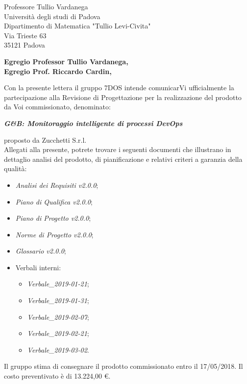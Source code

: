 \begin{letter}{Professore Tullio Vardanega \\ Università degli studi di Padova \\ Dipartimento di Matematica "Tullio Levi-Civita" \\ Via Trieste 63 \\ 35121 Padova}
\opening{\textbf{Egregio Professor Tullio Vardanega,\\Egregio Prof. Riccardo Cardin,}}
\begin{addmargin}[2em]{2em}
  Con la presente lettera il gruppo 7DOS intende comunicarVi ufficialmente la partecipazione alla Revisione di Progettazione per la realizzazione del prodotto da Voi commissionato, denominato:
   \singlespacing 
   \centerline{\textbf{\emph{G\&B: Monitoraggio intelligente di processi DevOps}}}
  \singlespacing
  proposto da Zucchetti S.r.l. \\
  Allegati alla presente, potrete trovare i seguenti documenti che illustrano in dettaglio analisi del prodotto, di pianificazione e relativi criteri a garanzia della qualità:
      \begin{itemize}
	      \item \emph{Analisi dei Requisiti v2.0.0};
	      \item \emph{Piano di Qualifica v2.0.0};
	      \item \emph{Piano di Progetto v2.0.0};
	      \item \emph{Norme di Progetto v2.0.0};
	      \item \emph{Glossario v2.0.0};
	      \item Verbali interni:
	            \begin{itemize}
		           	\item \emph{Verbale\_2019-01-21};
		           	\item \emph{Verbale\_2019-01-31};
		           	\item \emph{Verbale\_2019-02-07};
		           	\item \emph{Verbale\_2019-02-21};
		           	\item \emph{Verbale\_2019-03-02}.
	           	\end{itemize}
	\end{itemize}

  Il gruppo stima di consegnare il prodotto commissionato entro il 17/05/2018. Il costo preventivato è di 13.224,00 \euro.\\
  

\end{addmargin}
\end{letter}
